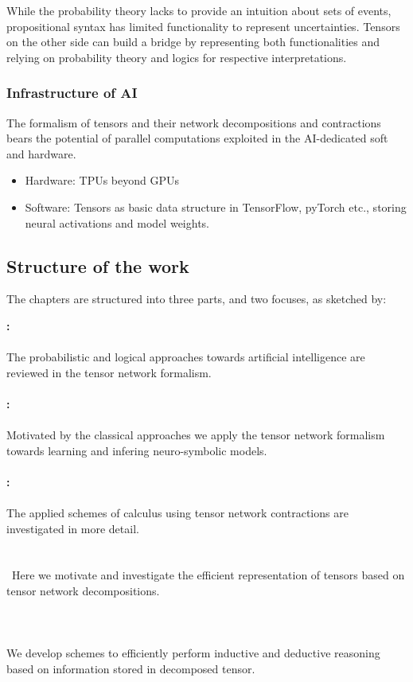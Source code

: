 While the probability theory lacks to provide an intuition about sets of events, propositional syntax has limited functionality to represent uncertainties.
Tensors on the other side can build a bridge by representing both functionalities and relying on probability theory and logics for respective interpretations.

\subsubsection{Infrastructure of AI}

The formalism of tensors and their network decompositions and contractions bears the potential of parallel computations exploited in the AI-dedicated soft and hardware.
\begin{itemize}
    \item Hardware: TPUs beyond GPUs
    \item Software: Tensors as basic data structure in TensorFlow, pyTorch etc., storing neural activations and model weights.
\end{itemize}

\subsection{Structure of the work}

The chapters are structured into three parts, and two focuses, as sketched by:


\textbf{: \partonetext} \\
\ \\
The probabilistic and logical approaches towards artificial intelligence are reviewed in the tensor network formalism. \\
\ \\
\textbf{: \parttwotext} \\
\ \\
Motivated by the classical approaches we apply the tensor network formalism towards learning and infering neuro-symbolic models. \\
\ \\
\textbf{: \partthreetext}\\
\ \\
The applied schemes of calculus using tensor network contractions are investigated in more detail.
\ \\
\textbf{\focusonespec}\\
\\\
Here we motivate and investigate the efficient representation of tensors based on tensor network decompositions. \\
\ \\
\textbf{\focustwospec}\\
\ \\
We develop schemes to efficiently perform inductive and deductive reasoning based on information stored in decomposed tensor.

